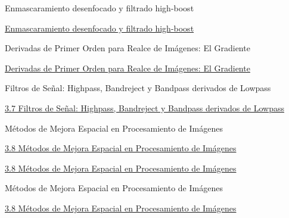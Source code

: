 \documentclass{beamer}
\begin{document}
\begin{frame}[fragile]{Enmascaramiento desenfocado y filtrado high-boost}

\href{run:Tema_3_6_pag_182.html}{Enmascaramiento desenfocado y filtrado high-boost}

\end{frame}

\begin{frame}[fragile]{Derivadas de Primer Orden para Realce de Imágenes: El Gradiente}

\href{run:Tema_3_6_pag_184.html}{Derivadas de Primer Orden para Realce de Imágenes: El Gradiente}

\end{frame}

\begin{frame}[fragile]{Filtros de Señal: Highpass, Bandreject y Bandpass derivados de Lowpass}

\href{run:Tema_3_7_pag_188.html}{3.7 Filtros de Señal: Highpass, Bandreject y Bandpass derivados de Lowpass}

\end{frame}

\begin{frame}[fragile]{Métodos de Mejora Espacial en Procesamiento de Imágenes}

\href{run:Tema_3_8_pag_191.html}{3.8 Métodos de Mejora Espacial en Procesamiento de Imágenes}

\end{frame}


\href{run:Tema_3_8_pag_191.html}{3.8 Métodos de Mejora Espacial en Procesamiento de Imágenes}

\begin{frame}[fragile]{Métodos de Mejora Espacial en Procesamiento de Imágenes}

\href{https://1drv.ms/u/s!AmnSq06Ge2Zqks5zTf2hhng2VKFo2w?e=SAB90N}{3.8 Métodos de Mejora Espacial en Procesamiento de Imágenes}

\end{frame}
\end{document}
